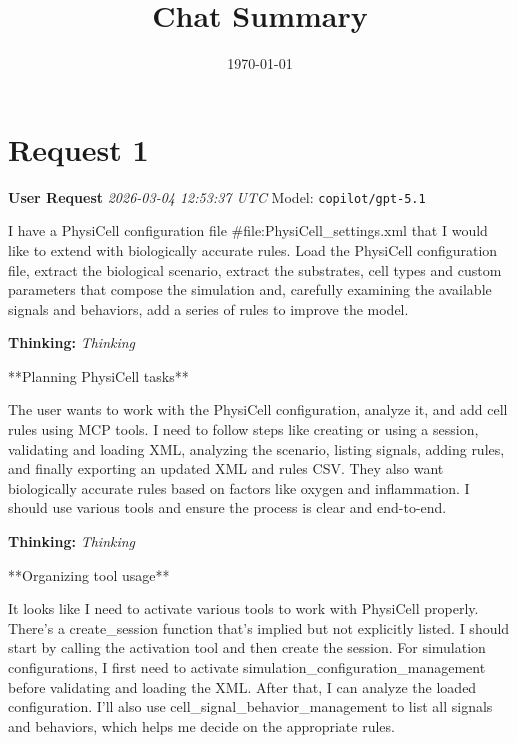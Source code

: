 \documentclass[11pt,a4paper]{article}
\title{Chat Summary}
\date{\today}
\begin{document}
\maketitle
\tableofcontents
\newpage

\section{Request 1}
\begin{userbox}
\textbf{User Request}
\quad \textit{2026-03-04 12:53:37 UTC}
\quad Model: \texttt{copilot/gpt-5.1}

I have a PhysiCell configuration file \#file:PhysiCell\_settings.xml  that I would like to extend with biologically accurate rules. Load the PhysiCell configuration file, extract the biological scenario, extract the substrates, cell types and custom parameters that compose the simulation and, carefully examining the available signals and behaviors, add a series of rules to improve the model.

\end{userbox}
\begin{thinkbox}
\textbf{Thinking:} \textit{Thinking}

**Planning PhysiCell tasks**

The user wants to work with the PhysiCell configuration, analyze it, and add cell rules using MCP tools. I need to follow steps like creating or using a session, validating and loading XML, analyzing the scenario, listing signals, adding rules, and finally exporting an updated XML and rules CSV. They also want biologically accurate rules based on factors like oxygen and inflammation. I should use various tools and ensure the process is clear and end-to-end.

\end{thinkbox}
\begin{thinkbox}
\textbf{Thinking:} \textit{Thinking}

**Organizing tool usage**

It looks like I need to activate various tools to work with PhysiCell properly. There’s a create\_session function that’s implied but not explicitly listed. I should start by calling the activation tool and then create the session. For simulation configurations, I first need to activate simulation\_configuration\_management before validating and loading the XML. After that, I can analyze the loaded configuration. I'll also use cell\_signal\_behavior\_management to list all signals and behaviors, which helps me decide on the appropriate rules.

\end{thinkbox}
\end{document}
